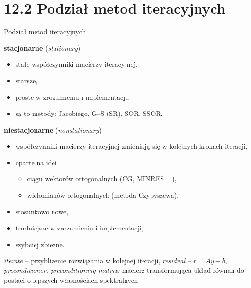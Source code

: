 \section{12.2 Podział metod iteracyjnych}

\begin{frame}{Podział metod iteracyjnych}
  \begin{block}{\textbf{stacjonarne} (\emph{stationary})}
    \begin{itemize}
      \item stałe współczynniki macierzy iteracyjnej,
      \item starsze,
      \item proste w zrozumieniu i implementacji,
      \item są to metody: Jacobiego, G--S (SR), SOR, SSOR.
    \end{itemize}
  \end{block}
\end{frame}

\begin{frame}{}
  \begin{block}{\textbf{niestacjonarne} (\emph{nonstationary})}
    \begin{itemize}
      \item współczynniki macierzy iteracyjnej zmieniają się w kolejnych krokach iteracji,
      \item oparte na idei
      \begin{itemize}
        \item ciągu wektorów ortogonalnych (CG, MINRES ...),
        \item wielomianów ortogonalnych (metoda Czybyszewa),
      \end{itemize}
      \item stosunkowo nowe,
      \item trudniejsze w zrozumieniu i implementacji,
      \item szybciej zbieżne.
    \end{itemize}
  \end{block}
\end{frame}

\begin{frame}{}
  \begin{block}{}
    \emph{iterate} -- przybliżenie rozwiązania w kolejnej iteracji,
    \newline \emph{residual} -- $r=Ay-b$,
    \newline \emph{preconditioner, preconditioning matrix:} macierz transformująca układ równań do postaci o lepszych własnościach spektralnych
  \end{block}
\end{frame}
